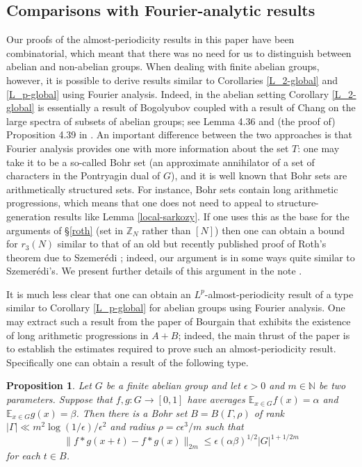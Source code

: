 \documentclass[12pt,a4paper,reqno]{amsart}
\numberwithin{equation}{section}
\theoremstyle{plain}
\newtheorem{proposition}[theorem]{Proposition}
\theoremstyle{definition}
\renewcommand{\leq}{\leqslant}
\def\E{\mathbb{E}}
\def\Z{\mathbb{Z}}
\def\N{\mathbb{N}}
\newcommand{\Zmod}[1]{\Z_#1} %
\providecommand{\norm}[1]{\lVert#1\rVert}
\begin{document}
\subsection{Comparisons with Fourier-analytic results}
Our proofs of the almost-periodicity results in this paper have been combinatorial, which meant that there was no need for us to distinguish between abelian and non-abelian groups. When dealing with finite abelian groups, however, it is possible to derive results similar to Corollaries \ref{L_2-global} and \ref{L_p-global} using Fourier analysis. Indeed, in the abelian setting Corollary \ref{L_2-global} is essentially a result of Bogolyubov \cite{bogolyubov} coupled with a result of Chang \cite{chang} on the large spectra of subsets of abelian groups; see Lemma 4.36 and (the proof of) Proposition 4.39 in \cite{tao-vu}. An important difference between the two approaches is that Fourier analysis provides one with more information about the set $T$: one may take it to be a so-called Bohr set (an approximate annihilator of a set of characters in the Pontryagin dual of $G$), and it is well known that Bohr sets are arithmetically structured sets. For instance, Bohr sets contain long arithmetic progressions, which means that one does not need to appeal to structure-generation results like Lemma \ref{local-sarkozy}. If one uses this as the base for the arguments of \S\ref{roth} (set in $\Zmod{N}$ rather than $[N]$) then one can obtain a bound for $r_3(N)$ similar to that of an old but recently published proof of Roth's theorem due to Szemer\'edi \cite{szemeredi}; indeed, our argument is in some ways quite similar to Szemer\'edi's. We present further details of this argument in the note \cite{croot-sisask:SzemerediRothNote}.

It is much less clear that one can obtain an $L^p$-almost-periodicity result of a type similar to Corollary \ref{L_p-global} for abelian groups using Fourier analysis. One may extract such a result from the paper \cite{bourgain:longAPs} of Bourgain that exhibits the existence of long arithmetic progressions in $A+B$; indeed, the main thrust of the paper is to establish the estimates required to prove such an almost-periodicity result. Specifically one can obtain a result of the following type.

\begin{proposition}\label{bourgain-periodicity}
Let $G$ be a finite abelian group and let $\epsilon > 0$ and $m \in \N$ be two parameters. Suppose that $f, g : G \to [0,1]$ have averages $\E_{x \in G} f(x) = \alpha$ and $\E_{x \in G} g(x) = \beta$. Then there is a Bohr set $B = B(\Gamma, \rho)$ of rank $|\Gamma| \ll m^2\log(1/\epsilon)/\epsilon^2$ and radius $\rho = c \epsilon^3/m$ such that
\[ \norm{ f*g(x+t) - f*g(x) }_{2m} \leq \epsilon (\alpha \beta)^{1/2}|G|^{1+1/2m} \]
for each $t \in B$.
\end{proposition}
\end{document}
